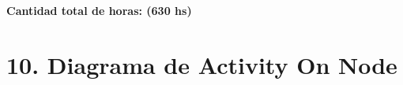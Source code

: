 \documentclass[
11pt, %
codirector, %
]{charter}
\begin{document}
\textbf{Cantidad total de horas: (630 hs)}

%
%
%
%

\section{10. Diagrama de Activity On Node}
\label{sec:AoN}

%
%
%
%
%
%
\end{document}
